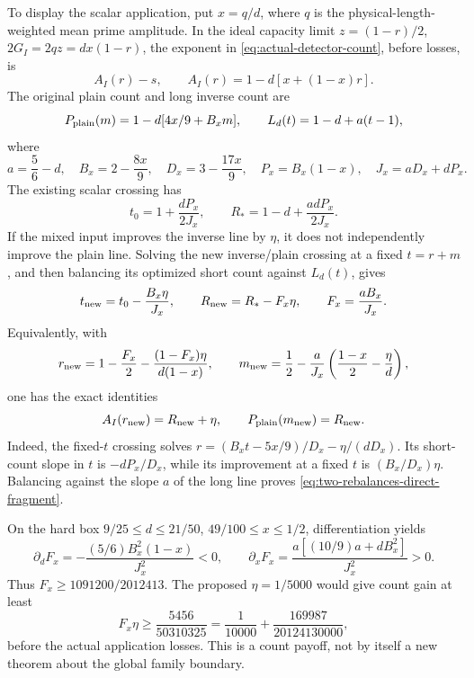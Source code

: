 \documentclass[11pt]{article}
\theoremstyle{definition}
\begin{document}
To display the scalar application, put \(x=q/d\), where \(q\) is the
physical-length-weighted mean prime amplitude.  In the ideal capacity
limit \(z=(1-r)/2\), \(2G_I=2qz=dx(1-r)\), the exponent in
\eqref{eq:actual-detector-count}, before losses, is
\begin{equation}
 A_I(r)-s,\qquad A_I(r)=1-d[x+(1-x)r].
 \label{eq:direct-count-line}
\end{equation}
The original plain count and long inverse count are
\begin{equation}
 P_{\rm plain}(m)=1-d[4x/9+B_xm],\qquad
 L_d(t)=1-d+a(t-1),
 \label{eq:plain-and-long-lines}
\end{equation}
where
\[
 a=\frac56-d,\quad B_x=2-\frac{8x}{9},\quad
 D_x=3-\frac{17x}{9},\quad P_x=B_x(1-x),\quad
 J_x=aD_x+dP_x.
\]
The existing scalar crossing has
\[
 t_0=1+\frac{dP_x}{2J_x},\qquad
 R_*=1-d+\frac{adP_x}{2J_x}.
\]
If the mixed input improves the inverse line by \(\eta\), it does not
independently improve the plain line.  Solving the new inverse/plain
crossing at a fixed \(t=r+m\), and then balancing its optimized short
count against \(L_d(t)\), gives
\begin{equation}
 t_{\rm new}=t_0-\frac{B_x\eta}{J_x},\qquad
 R_{\rm new}=R_*-F_x\eta,\qquad F_x=\frac{aB_x}{J_x}.
 \label{eq:two-rebalances-direct-fragment}
\end{equation}
Equivalently, with
\[
 r_{\rm new}=1-\frac{F_x}{2}-
       \frac{(1-F_x)\eta}{d(1-x)},\qquad
 m_{\rm new}=\frac12-\frac a{J_x}
       \left(\frac{1-x}{2}-\frac\eta d\right),
\]
one has the exact identities
\begin{equation}
 A_I(r_{\rm new})=R_{\rm new}+\eta,\qquad
 P_{\rm plain}(m_{\rm new})=R_{\rm new}.
 \label{eq:rebalance-identities-direct-fragment}
\end{equation}
Indeed, the fixed-\(t\) crossing solves
\(r=(B_xt-5x/9)/D_x-\eta/(dD_x)\).  Its short-count slope in \(t\)
is \(-dP_x/D_x\), while its improvement at a fixed \(t\) is
\((B_x/D_x)\eta\).  Balancing against the slope \(a\) of the long
line proves \eqref{eq:two-rebalances-direct-fragment}.

On the hard box \(9/25\le d\le21/50\),
\(49/100\le x\le1/2\), differentiation yields
\[
 \partial_dF_x=-\frac{(5/6)B_x^2(1-x)}{J_x^2}<0,\qquad
 \partial_xF_x=
 \frac{a[(10/9)a+dB_x^2]}{J_x^2}>0.
\]
Thus \(F_x\ge1091200/2012413\).  The proposed
\(\eta=1/5000\) would give count gain at least
\begin{equation}
 F_x\eta\ge\frac{5456}{50310325}
   =\frac1{10000}+\frac{169987}{20124130000},
 \label{eq:uniform-conditional-count-gain}
\end{equation}
before the actual application losses.  This is a count payoff, not by
itself a new theorem about the global family boundary.
\end{document}
